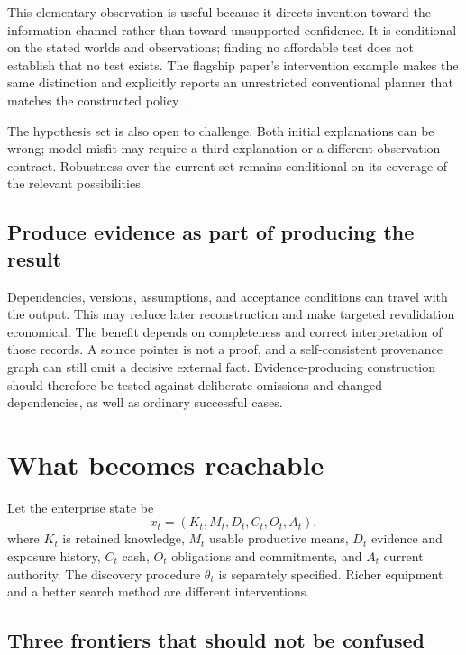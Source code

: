 \documentclass[10pt,a4paper]{article}
\begin{document}
This elementary observation is useful because it directs invention toward the information channel rather than toward unsupported confidence. It is conditional on the stated worlds and observations; finding no affordable test does not establish that no test exists. The flagship paper's intervention example makes the same distinction and explicitly reports an unrestricted conventional planner that matches the constructed policy~\citep{ti}.

The hypothesis set is also open to challenge. Both initial explanations can be wrong; model misfit may require a third explanation or a different observation contract. Robustness over the current set remains conditional on its coverage of the relevant possibilities.

\subsection{Produce evidence as part of producing the result}

Dependencies, versions, assumptions, and acceptance conditions can travel with the output. This may reduce later reconstruction and make targeted revalidation economical. The benefit depends on completeness and correct interpretation of those records. A source pointer is not a proof, and a self-consistent provenance graph can still omit a decisive external fact. Evidence-producing construction should therefore be tested against deliberate omissions and changed dependencies, as well as ordinary successful cases.


\section{What becomes reachable}\label{sec:model}

Let the enterprise state be
\begin{equation}
 x_t=(K_t,M_t,D_t,C_t,O_t,A_t),
\end{equation}
where $K_t$ is retained knowledge, $M_t$ usable productive means, $D_t$ evidence and exposure history, $C_t$ cash, $O_t$ obligations and commitments, and $A_t$ current authority. The discovery procedure $\theta_t$ is separately specified. Richer equipment and a better search method are different interventions.

\subsection{Three frontiers that should not be confused}
\end{document}
